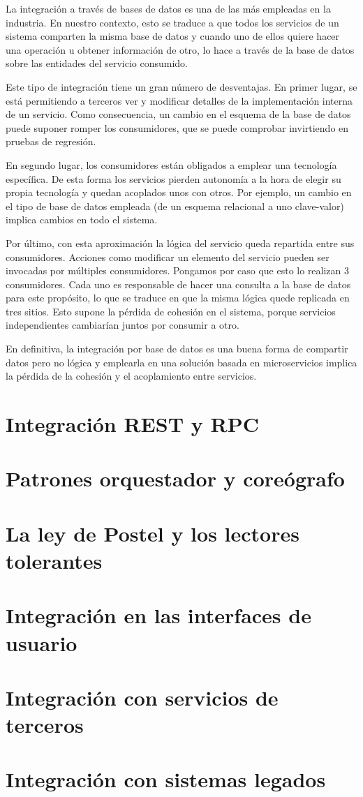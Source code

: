 \documentclass[11pt,a4paper]{article}
\begin{document}
La integración a través de bases de datos es una de las más empleadas en la industria. En nuestro contexto, esto se traduce a que todos los servicios de un sistema comparten la misma base de datos y cuando uno de ellos quiere hacer una operación u obtener información de otro, lo hace a través de la base de datos sobre las entidades del servicio consumido. 

Este tipo de integración tiene un gran número de desventajas. En primer lugar, se está permitiendo a terceros ver y modificar detalles de la implementación interna de un servicio. Como consecuencia, un cambio en el esquema de la base de datos puede suponer romper los consumidores, que se puede comprobar invirtiendo en pruebas de regresión.

En segundo lugar, los consumidores están obligados a emplear una tecnología específica. De esta forma los servicios pierden autonomía a la hora de elegir su propia tecnología y quedan acoplados unos con otros. Por ejemplo, un cambio en el tipo de base de datos empleada (de un esquema relacional a uno clave-valor) implica cambios en todo el sistema.

Por último, con esta aproximación la lógica del servicio queda repartida entre sus consumidores. Acciones como modificar un elemento del servicio pueden ser invocadas por múltiples consumidores. Pongamos por caso que esto lo realizan 3 consumidores. Cada uno es responsable de hacer una consulta a la base de datos para este propósito, lo que se traduce en que la misma lógica quede replicada en tres sitios. Esto supone la pérdida de cohesión en el sistema, porque servicios independientes cambiarían juntos por consumir a otro.

En definitiva, la integración por base de datos es una buena forma de compartir datos pero no lógica y emplearla en una solución basada en microservicios implica la pérdida de la cohesión y el acoplamiento entre servicios.


\section{Integración REST y RPC}

\section{Patrones orquestador y coreógrafo}

\section{La ley de Postel y los lectores tolerantes}

\section{Integración en las interfaces de usuario}

\section{Integración con servicios de terceros}

\section{Integración con sistemas legados}
\end{document}
